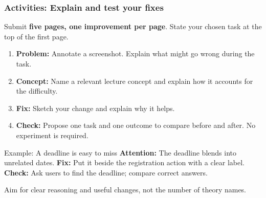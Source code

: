 \documentclass{beamer}
\begin{document}
\begin{frame}
    \frametitle{Activities: Explain and test your fixes}
    \small
    Submit \textbf{five pages, one improvement per page}.
    State your chosen task at the top of the first page.
    \begin{enumerate}
        \item \textbf{Problem:} Annotate a screenshot. Explain
        what might go wrong during the task.
        \item \textbf{Concept:} Name a relevant lecture concept
        and explain how it accounts for the difficulty.
        \item \textbf{Fix:} Sketch your change and explain why it helps.
        \item \textbf{Check:} Propose one task and one outcome
        to compare before and after. No experiment is required.
    \end{enumerate}
    \begin{block}{Example: A deadline is easy to miss}
    \textbf{Attention:} The deadline blends into unrelated dates.
    \textbf{Fix:} Put it beside the registration action with a clear label.
    \textbf{Check:} Ask users to find the deadline; compare correct answers.
    \end{block}
    {\footnotesize Aim for clear reasoning and useful changes, not the number of theory names.}
\end{frame}
%

%

%
%
%
%
%
%
\end{document}
